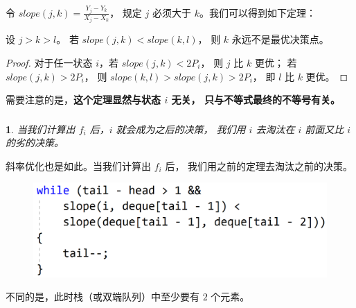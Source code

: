 \documentclass[9pt, UTF8]{beamer} %
\newcommand \fts {\frametitle{\insertsubsection}}
\newtheorem*{bbox}{}
\begin{document}
	\begin{frame}
		\fts

		令 $slope(j, k) = \frac {Y_j - Y_k} {X_j - X_k}$，
		规定 $j$ 必须大于 $k$。我们可以得到如下定理：

		\begin{theorem}
			设 $j > k > l$。
			若 $slope(j, k) < slope(k, l)$，
			则 $k$ 永远不是最优决策点。
		\end{theorem}

		\pause

		\begin{proof}
			对于任一状态 $i$，若 $slope(j, k) < 2 P_i$，
			则 $j$ 比 $k$ 更优；
			若 $slope(j, k) > 2 P_i$，
			则 $slope(k, l) > slope(j, k) > 2 P_i$，
			即 $l$ 比 $k$ 更优。
		\end{proof}

		需要注意的是，\textbf{这个定理显然与状态 $i$ 无关，
		只与不等式最终的不等号有关。}
	\end{frame}

	\begin{frame}
		\fts

		\begin{bbox}
			当我们计算出 $f_i$ 后，$i$ 就会成为之后的决策，
			我们用 $i$ 去淘汰在 $i$ 前面又比 $i$ 的劣的决策。
		\end{bbox}

		斜率优化也是如此。当我们计算出 $f_i$ 后，
		我们用之前的定理去淘汰之前的决策。
		\begin{figure}
			\centering
			\includegraphics[scale=0.15]{pic/pic2.png}
		\end{figure}

		不同的是，此时栈（或双端队列）中至少要有 $2$ 个元素。
	\end{frame}
\end{document}
